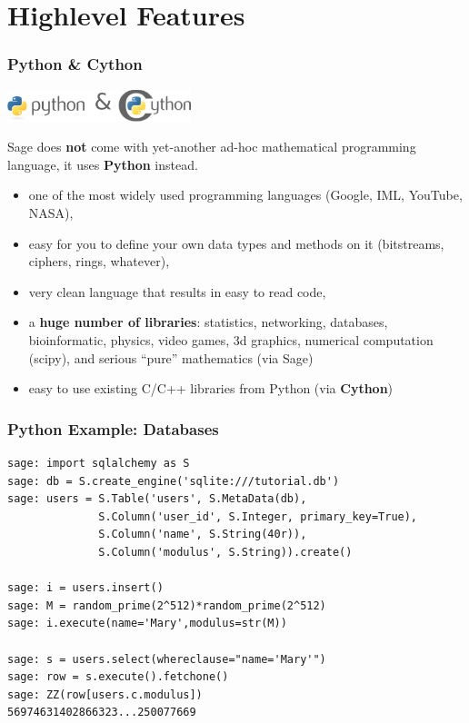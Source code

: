 \documentclass[10pt]{beamer}
\renewcommand{\emph}[1]{\textbf{\color{oxygenblue}#1}}
\begin{document}
\section{Highlevel Features}

\begin{frame}[fragile]
\frametitle{Python \& Cython}
\begin{center}
 \includegraphics[width=0.4\textwidth]{python-and-cython.png}
\end{center}

Sage does \emph{not} come with yet-another ad-hoc mathematical programming language, it uses
\emph{Python} instead.

\begin{itemize}
\item one of the most widely used programming languages (Google, IML, YouTube, NASA),
\item easy for you to define your own data types and methods on it (bitstreams, ciphers, rings, whatever),
\item very clean language that results in easy to read code,
\item a \emph{huge number of libraries}: statistics, networking, databases,
bioinformatic, physics, video games, 3d graphics, numerical computation (scipy),
and serious ``pure'' mathematics (via Sage)
\item easy to use existing C/C++ libraries from Python (via \emph{Cython})
\end{itemize}
\end{frame}



\begin{frame}[fragile]
\frametitle{Python Example: Databases}

\begin{lstlisting}
sage: import sqlalchemy as S
sage: db = S.create_engine('sqlite:///tutorial.db')
sage: users = S.Table('users', S.MetaData(db),
              S.Column('user_id', S.Integer, primary_key=True),
              S.Column('name', S.String(40r)),
              S.Column('modulus', S.String)).create()

sage: i = users.insert()
sage: M = random_prime(2^512)*random_prime(2^512)
sage: i.execute(name='Mary',modulus=str(M))

sage: s = users.select(whereclause="name='Mary'")
sage: row = s.execute().fetchone()
sage: ZZ(row[users.c.modulus])
56974631402866323...250077669
\end{lstlisting}

\end{frame}
\end{document}
